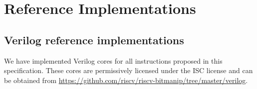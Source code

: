 \chapter{Reference Implementations}
\label{reference}


\section{Verilog reference implementations}

We have implemented Verilog cores for all instructions proposed in this
specification. These cores are permissively licensed under the ISC license and
can be obtained from \url{https://github.com/riscv/riscv-bitmanip/tree/master/verilog}.

